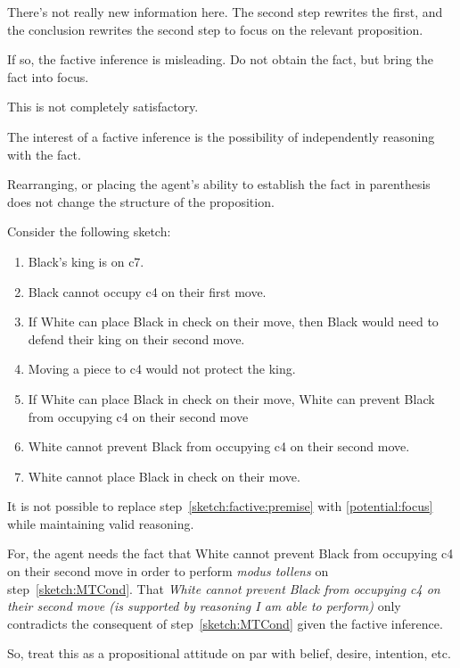 \documentclass[10pt]{article}
\begin{document}
There's not really new information here.
The second step rewrites the first, and the conclusion rewrites the second step to focus on the relevant proposition.

If so, the factive inference is misleading.
Do not obtain the fact, but bring the fact into focus.

This is not completely satisfactory.

The interest of a factive inference is the possibility of independently reasoning with the fact.

Rearranging, or placing the agent's ability to establish the fact in parenthesis does not change the structure of the proposition.

Consider the following sketch:

\begin{enumerate}
\item Black's king is on c7.
\item Black cannot occupy c4 on their first move.
\item If White can place Black in check on their move, then Black would need to defend their king on their second move.
\item Moving a piece to c4 would not protect the king.
\item\label{sketch:MTCond} If White can place Black in check on their move, White can prevent Black from occupying c4 on their second move
\item\label{sketch:factive:premise} White cannot prevent Black from occupying c4 on their second move.
\item\label{sketch:conclusion} White cannot place Black in check on their move.
\end{enumerate}

It is not possible to replace step~\ref{sketch:factive:premise} with \ref{potential:focus} while maintaining valid reasoning.

For, the agent needs the fact that White cannot prevent Black from occupying c4 on their second move in order to perform \emph{modus tollens} on step~\ref{sketch:MTCond}.
That \emph{White cannot prevent Black from occupying c4 on their second move (is supported by reasoning I am able to perform)} only contradicts the consequent of step~\ref{sketch:MTCond} given the factive inference.



So, treat this as a propositional attitude on par with belief, desire, intention, etc.
\end{document}
